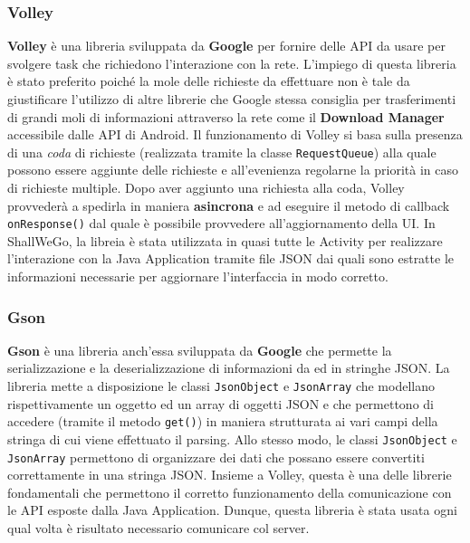                 \subsubsection{Volley}
                    \textbf{Volley} è una libreria sviluppata da \textbf{Google} per fornire delle API da usare per svolgere task che richiedono l'interazione con la rete. L'impiego di questa libreria è stato preferito poiché la mole delle richieste da effettuare non è tale da giustificare l'utilizzo di altre librerie che Google stessa consiglia per trasferimenti di grandi moli di informazioni attraverso la rete come il \textbf{Download Manager} accessibile dalle API di Android. Il funzionamento di Volley si basa sulla presenza di una \textit{coda} di richieste (realizzata tramite la classe \texttt{RequestQueue}) alla quale possono essere aggiunte delle richieste e all'evenienza regolarne la priorità in caso di richieste multiple.
                    Dopo aver aggiunto una richiesta alla coda, Volley provvederà a spedirla in maniera \textbf{asincrona} e ad eseguire il metodo di callback \texttt{onResponse()} dal quale è possibile provvedere all'aggiornamento della UI. In ShallWeGo, la libreia è stata utilizzata in quasi tutte le Activity per realizzare l'interazione con la Java Application tramite file JSON dai quali sono estratte le informazioni necessarie per aggiornare l'interfaccia in modo corretto.
                
                \subsubsection{Gson}
                    \textbf{Gson} è una libreria anch'essa sviluppata da \textbf{Google} che permette la serializzazione e la deserializzazione di informazioni da ed in stringhe JSON. La libreria mette a disposizione le classi \texttt{JsonObject} e \texttt{JsonArray} che modellano rispettivamente un oggetto ed un array di oggetti JSON e che permettono di accedere (tramite il metodo \texttt{get()}) in maniera strutturata ai vari campi della stringa di cui viene effettuato il parsing. Allo stesso modo, le classi \texttt{JsonObject} e \texttt{JsonArray} permettono di organizzare dei dati che possano essere convertiti correttamente in una stringa JSON. Insieme a Volley, questa è una delle librerie fondamentali che permettono il corretto funzionamento della comunicazione con le API esposte dalla Java Application. Dunque, questa libreria è stata usata ogni qual volta è risultato necessario comunicare col server.

